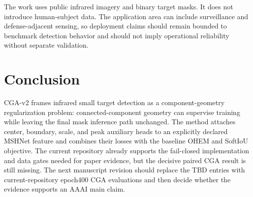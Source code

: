 \documentclass[letterpaper]{article}
\begin{document}
The work uses public infrared imagery and binary target masks. It does not introduce human-subject data. The application area can include surveillance and defense-adjacent sensing, so deployment claims should remain bounded to benchmark detection behavior and should not imply operational reliability without separate validation.

\section{Conclusion}

CGA-v2 frames infrared small target detection as a component-geometry regularization problem: connected-component geometry can supervise training while leaving the final mask inference path unchanged. The method attaches center, boundary, scale, and peak auxiliary heads to an explicitly declared MSHNet feature and combines their losses with the baseline OHEM and SoftIoU objective. The current repository already supports the fail-closed implementation and data gates needed for paper evidence, but the decisive paired CGA result is still missing. The next manuscript revision should replace the TBD entries with current-repository epoch400 CGA evaluations and then decide whether the evidence supports an AAAI main claim.


\end{document}
